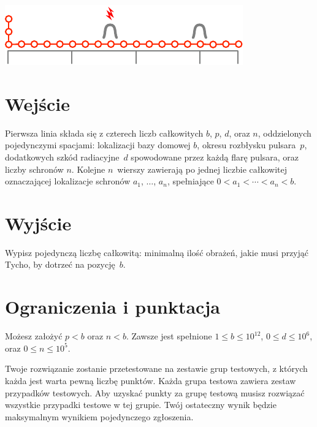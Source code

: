 \includegraphics[width=.4\textwidth]{img/sample3.pdf}

\section*{Wejście}

Pierwsza linia składa się z czterech liczb całkowitych $b$, $p$, $d$, oraz $n$, oddzielonych pojedynczymi spacjami:
lokalizacji bazy domowej $b$,
okresu rozbłysku pulsara~$p$,
dodatkowych szkód radiacyjne~$d$ spowodowane przez każdą flarę pulsara,
oraz liczby schronów $n$.
Kolejne $n$~wierszy zawierają po jednej liczbie całkowitej oznaczającej lokalizacje schronów $a_1$, $\ldots$, $a_n$, spełniające
$0<a_1<\cdots <a_n< b$. %

\section*{Wyjście}

Wypisz pojedynczą liczbę całkowitą: minimalną ilość obrażeń, jakie musi przyjąć Tycho, by dotrzeć na pozycję~$b$.

\section*{Ograniczenia i punktacja}

Możesz założyć
$p < b$ %
oraz
$n < b$. %
Zawsze jest spełnione
$1\leq b\leq 10^{12}$, %
$0\leq d \leq 10^6$, %
oraz
$0\leq n \leq 10^5$. %

Twoje rozwiązanie zostanie przetestowane na zestawie grup testowych, z których każda jest warta pewną liczbę punktów.
Każda grupa testowa zawiera zestaw przypadków testowych.
Aby uzyskać punkty za grupę testową musisz rozwiązać wszystkie przypadki testowe w tej grupie.
Twój ostateczny wynik będzie maksymalnym wynikiem pojedynczego zgłoszenia.

